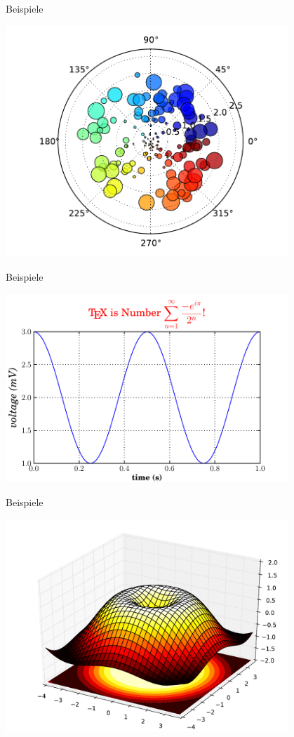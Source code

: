 \begin{frame}{Beispiele}
  \begin{center}
    \includegraphics[width=0.8\textwidth]{img/matplotlib/polar.pdf}
  \end{center}
\end{frame}

\begin{frame}{Beispiele}
  \begin{center}
    \includegraphics[width=0.8\textwidth]{img/matplotlib/tex.pdf}
  \end{center}
\end{frame}

\begin{frame}{Beispiele}
  \begin{center}
    \includegraphics[width=0.8\textwidth]{img/matplotlib/mplot3d.pdf}
  \end{center}
\end{frame}

